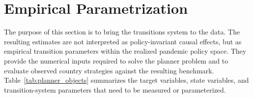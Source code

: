 \documentclass[12pt, a4paper]{article}
\begin{document}

\section{Empirical Parametrization}

The purpose of this section is to bring the transitions system to the data. The resulting estimates are not interpreted as policy-invariant causal effects, but as empirical transition parameters within the realized pandemic policy space. They provide the numerical inputs required to solve the planner problem and to evaluate observed country strategies against the resulting benchmark. Table~\ref{tab:planner_objects} summarizes the target variables, state variables, and transition-system parameters that need to be measured or parameterized.
\end{document}
